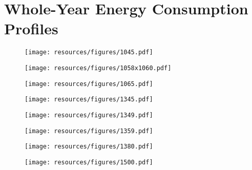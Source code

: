 \newpage
\section{Whole-Year Energy Consumption Profiles}

\renewcommand\thefigure{\Alph{section}.\arabic{figure}}
\setcounter{figure}{0}

\begin{figure}[h]
\centering
\texttt{[image: resources/figures/1045.pdf]}
\label{fig:appendix_1045}
\end{figure}

\begin{figure}[h]
\centering
\texttt{[image: resources/figures/1058x1060.pdf]}
\label{fig:appendix_1058x1060}
\end{figure}

\begin{figure}[h]
\centering
\texttt{[image: resources/figures/1065.pdf]}
\label{fig:appendix_1065}
\end{figure}

\begin{figure}[h]
\centering
\texttt{[image: resources/figures/1345.pdf]}
\label{fig:appendix_1345}
\end{figure}

\begin{figure}[h]
\centering
\texttt{[image: resources/figures/1349.pdf]}
\label{fig:appendix_1349}
\end{figure}

\begin{figure}[h]
\centering
\texttt{[image: resources/figures/1359.pdf]}
\label{fig:appendix_1359}
\end{figure}

\begin{figure}[h]
\centering
\texttt{[image: resources/figures/1380.pdf]}
\label{fig:appendix_1380}
\end{figure}

\begin{figure}[h]
\centering
\texttt{[image: resources/figures/1500.pdf]}
\label{fig:appendix_1500}
\end{figure}

